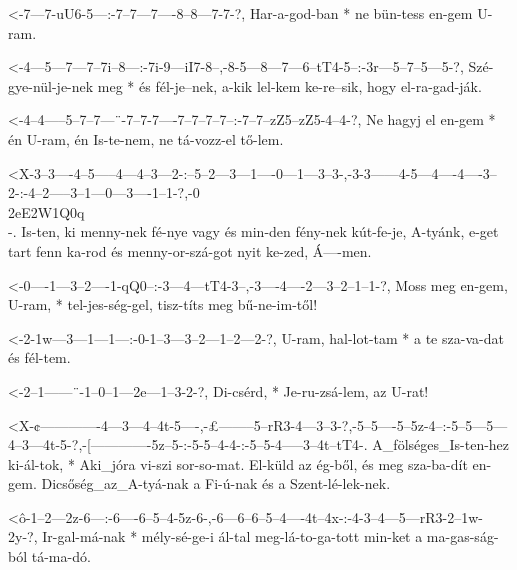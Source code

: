   {<-7---7-uU6-5---:-7--7---7----8--8---7-7-?,}
  {  Har-a-god-ban * ne bün-tess en-gem U-ram.}

  {<-4---5---7---7--7i--8---:-7i-9---iI7-8--,-8-5---8---7---6--tT4-5--:-3r---5--7--5---5-?,}
  {  Szé-gye-nül-je-nek meg * és fél-je--nek, a-kik lel-kem ke-re--sik, hogy el-ra-gad-ják.}

  {<-4--4-----5--7--7---¨-7--7-7----7--7--7--7--:-7--7--zZ5--zZ5-4--4-?,}
  {  Ne hagyj el en-gem * én U-ram, én Is-te-nem, ne tá-vozz-el  tő-lem.}


  {<X-3--3----4--5-----4---4--3---2-:--5--2---3---1----0---1---3--3-,-3-3------4-5---4----4----3--2-:-4--2-----3--1---0---3----1--1-?,-0\\2eE2W1Q0q\\-.}
  {   Is-ten, ki menny-nek fé-nye vagy és min-den fény-nek kút-fe-je, A-tyánk, e-get tart fenn ka-rod és menny-or-szá-got nyit ke-zed, Á----men.}

  {<-0----1---3--2----1-qQ0--:-3---4---tT4-3--,-3----4----2---3--2--1--1-?,}
  {  Moss meg en-gem, U-ram, * tel-jes-ség-gel, tisz-títs meg bű-ne-im-től!}

  {<-2-1w---3---1---1---:-0-1--3---3--2---1--2---2-?,}
  {  U-ram, hal-lot-tam * a te sza-va-dat és fél-tem.}

  {<-2--1------¨-1--0--1---2e---1--3-2-?,}
  {  Di-csérd, * Je-ru-zsá-lem, az U-rat!}

  {<X-¢-------------4---3---4--4t-5----,-£--------5--rR3-4---3--3-?,-5--5----5--5z-4--:-5--5---5---4--3---4t-5-?,-[-------------5z--5-:-5-5--4-4-:-5--5-4-----3--4t--tT4-.}
  {   A_fölséges_Is-ten-hez ki-ál-tok, * Aki_jóra vi-szi sor-so-mat. El-küld az ég-ből, és meg sza-ba-dít en-gem. Dicsőség_az_A-tyá-nak a Fi-ú-nak és a Szent-lé-lek-nek.}

  {<ô-1--2---2z-6---:-6----6--5--4-5z-6-,-6---6--6--5--4----4t--4x-:-4-3--4---5---rR3-2--1w-2y-?,}
  {   Ir-gal-má-nak * mély-sé-ge-i ál-tal meg-lá-to-ga-tott min-ket  a ma-gas-ság-ból tá-ma-dó.}

